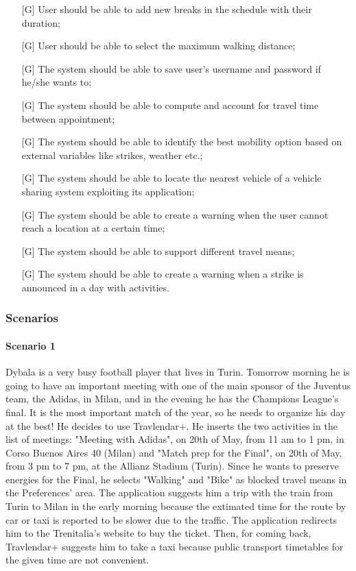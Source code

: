 \documentclass[12pt,titlepage]{article}
\begin{document}
\begin{itemize}
\item [{[G\ped{14}]}]		User should be able to add new breaks in the schedule with their duration;
\item [{[G\ped{15}]}]		User should be able to select the maximum walking distance;
\item [{[G\ped{16}]}]	The system should be able to save user's username and password if he/she wants to;
\item [{[G\ped{17}]}]		The system should be able to compute and account for travel time between appointment;
\item [{[G\ped{18}]}]		The system should be able to identify the best mobility option based on external variables like strikes, weather etc.;
\item [{[G\ped{19}]}]		The system should be able to locate the nearest vehicle of a vehicle sharing system exploiting its application;
\item [{[G\ped{20}]}]		The system should be able to create a warning when the user cannot reach a location at a certain time;
\item [{[G\ped{21}]}]		The system should be able to support different travel means;
\item [{[G\ped{22}]}]		The system should be able to create a warning when a strike is announced in a day with activities.
\end{itemize}
\subsubsection{Scenarios}\label{sec:mod1}
\paragraph{Scenario 1}
Dybala is a very busy football player that lives in Turin. Tomorrow morning he is going to have an important meeting with one of the main sponsor of the Juventus team, the Adidas, in Milan, and in the evening he has the Champions League's final. It is the most important match of the year, so he needs to organize his day at the best! He decides to use Travlendar+. He inserts the two activities in the list of meetings: "Meeting with Adidas", on 20th of May, from 11 am to 1 pm, in Corso Buenos Aires 40 (Milan) and "Match prep for the Final", on 20th of May, from 3 pm to 7 pm, at the Allianz Stadium (Turin). Since he wants to preserve energies for the Final, he selects "Walking" and "Bike" as blocked travel means in the Preferences' area. The application suggests him a trip with the train from Turin to Milan in the early morning because the extimated time for the route by car or taxi is reported to be slower due to the traffic. The application redirects him to the Trenitalia's website to buy the ticket. Then, for coming back, Travlendar+ suggests him to take a taxi because public transport timetables for the given time are not convenient. 
\end{document}
